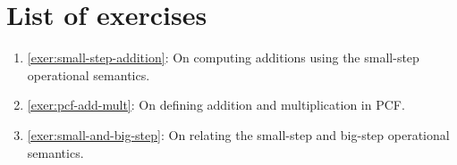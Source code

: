 \section{List of exercises}
\begin{enumerate}
\item \cref{exer:small-step-addition}: On computing additions using the
  small-step operational semantics.
\item \cref{exer:pcf-add-mult}: On defining addition and multiplication in PCF.
\item \cref{exer:small-and-big-step}: On relating the small-step and big-step
  operational semantics.
\end{enumerate}




